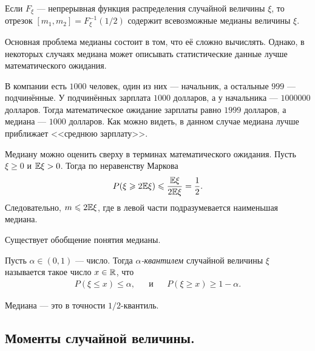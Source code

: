 \documentclass[../main.tex]{subfiles}
\begin{document}
\begin{remrk*}
 Если $ F_\xi $ --- непрерывная функция распределения случайной величины $ \xi $, то отрезок $ [m_1,m_2] = F_\xi^{-1}(1/2) $ содержит всевозможные медианы величины $ \xi $.
\end{remrk*}

Основная проблема медианы состоит в том, что её сложно вычислять. Однако, в некоторых случаях медиана может описывать статистические данные лучше математического ожидания.

\begin{exmpl*}
 В компании есть $ 1000 $ человек, один из них --- начальник, а остальные $ 999 $ --- подчинённые. У подчинённых зарплата $ 1000 $ долларов, а у начальника --- $ 1000000 $ долларов. Тогда математическое ожидание зарплаты равно $ 1999 $ долларов, а медиана --- $ 1000 $ долларов. Как можно видеть, в данном случае медиана лучше приближает <<среднюю зарплату>>.
\end{exmpl*}

\begin{remrk*}
 Медиану можно оценить сверху в терминах математического ожидания. Пусть $ \xi \geqslant 0 $ и $ \mathbb E\xi > 0 $. Тогда по неравенству Маркова
 \begin{align*}
  P(\xi \geqslant 2\mathbb E\xi) \leqslant \frac{\mathbb E\xi}{2\mathbb E\xi} = \frac{1}{2}.
 \end{align*} Следовательно, $ m \leqslant 2\mathbb E\xi $, где в левой части подразумевается наименьшая медиана.
\end{remrk*}

Существует обобщение понятия медианы.

\begin{df*}
 Пусть $ \alpha \in (0,1) $ --- число. Тогда \textit{$ \alpha $-квантилем} случайной величины $ \xi $ называется такое число $ x \in \mathbb{R} $, что
 \begin{align*}
  P(\xi \leqslant x) \leqslant \alpha, &&\text{и} &&P(\xi \geqslant x) \geqslant 1 - \alpha.
 \end{align*}
\end{df*}

Медиана --- это в точности $ 1 / 2 $-квантиль.

\subsection{Моменты случайной величины.}
\end{document}
